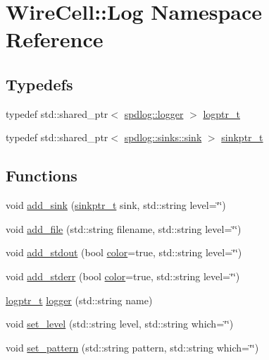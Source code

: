 \hypertarget{namespace_wire_cell_1_1_log}{}\section{Wire\+Cell\+:\+:Log Namespace Reference}
\label{namespace_wire_cell_1_1_log}
\subsection*{Typedefs}
\begin{DoxyCompactItemize}
\item 
typedef std\+::shared\+\_\+ptr$<$ \hyperlink{classspdlog_1_1logger}{spdlog\+::logger} $>$ \hyperlink{namespace_wire_cell_1_1_log_a5147137d4bcdf4d35c235c5c1ec1495f}{logptr\+\_\+t}
\item 
typedef std\+::shared\+\_\+ptr$<$ \hyperlink{classspdlog_1_1sinks_1_1sink}{spdlog\+::sinks\+::sink} $>$ \hyperlink{namespace_wire_cell_1_1_log_abee3220a6c332928df3d1583550c6e22}{sinkptr\+\_\+t}
\end{DoxyCompactItemize}
\subsection*{Functions}
\begin{DoxyCompactItemize}
\item 
void \hyperlink{namespace_wire_cell_1_1_log_adbf98ba02ee62812b211ede24464c91c}{add\+\_\+sink} (\hyperlink{namespace_wire_cell_1_1_log_abee3220a6c332928df3d1583550c6e22}{sinkptr\+\_\+t} sink, std\+::string level=\char`\"{}\char`\"{})
\item 
void \hyperlink{namespace_wire_cell_1_1_log_a2b30e7b1375fa3fdb23be092fe116cfb}{add\+\_\+file} (std\+::string filename, std\+::string level=\char`\"{}\char`\"{})
\item 
void \hyperlink{namespace_wire_cell_1_1_log_a417843ceafbe08958ee4d72acf1732d0}{add\+\_\+stdout} (bool \hyperlink{color_8h_a80d1dc5f416b97f92939a4166d41203c}{color}=true, std\+::string level=\char`\"{}\char`\"{})
\item 
void \hyperlink{namespace_wire_cell_1_1_log_a01ca295ba785cd50c408dc064404949c}{add\+\_\+stderr} (bool \hyperlink{color_8h_a80d1dc5f416b97f92939a4166d41203c}{color}=true, std\+::string level=\char`\"{}\char`\"{})
\item 
\hyperlink{namespace_wire_cell_1_1_log_a5147137d4bcdf4d35c235c5c1ec1495f}{logptr\+\_\+t} \hyperlink{namespace_wire_cell_1_1_log_a7675bcc4bf25b2bc66314d5c096cf676}{logger} (std\+::string name)
\item 
void \hyperlink{namespace_wire_cell_1_1_log_af453ddce8d810f730dca72024376727e}{set\+\_\+level} (std\+::string level, std\+::string which=\char`\"{}\char`\"{})
\item 
void \hyperlink{namespace_wire_cell_1_1_log_accaf0fe0149777811d7c5a648fe3f5e4}{set\+\_\+pattern} (std\+::string pattern, std\+::string which=\char`\"{}\char`\"{})
\end{DoxyCompactItemize}



